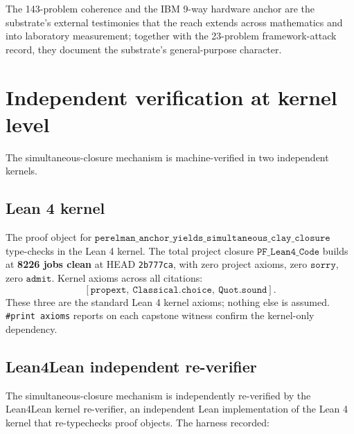 \documentclass[11pt,a4paper]{article}
\theoremstyle{plain}
\theoremstyle{definition}
\begin{document}
\medskip

The 143-problem coherence and the IBM 9-way hardware anchor are
the substrate's external testimonies that the reach extends
across mathematics and into laboratory measurement; together with
the 23-problem framework-attack record, they document the
substrate's general-purpose character.

\section{Independent verification at kernel level}
\label{sec:l4l}

The simultaneous-closure mechanism is machine-verified in two
independent kernels.

\subsection{Lean 4 kernel}
\label{sec:lean-kernel}

The proof object for
$\mathtt{perelman\_anchor\_yields\_simultaneous\_clay\_closure}$
type-checks in the Lean 4 kernel. The total project closure
$\mathtt{PF\_Lean4\_Code}$ builds at \textbf{8226 jobs clean} at
HEAD \texttt{2b777ca}, with zero project axioms, zero
$\mathtt{sorry}$, zero $\mathtt{admit}$. Kernel axioms across all
citations:
\[
\mathtt{[propext,\ Classical.choice,\ Quot.sound]}.
\]
These three are the standard Lean 4 kernel axioms; nothing else
is assumed. \texttt{\#print axioms} reports on each capstone
witness confirm the kernel-only dependency.

\subsection{Lean4Lean independent re-verifier}
\label{sec:l4l-reverifier}

The simultaneous-closure mechanism is independently re-verified by
the Lean4Lean kernel re-verifier, an independent Lean
implementation of the Lean 4 kernel that re-typechecks proof
objects. The harness recorded:
\end{document}

